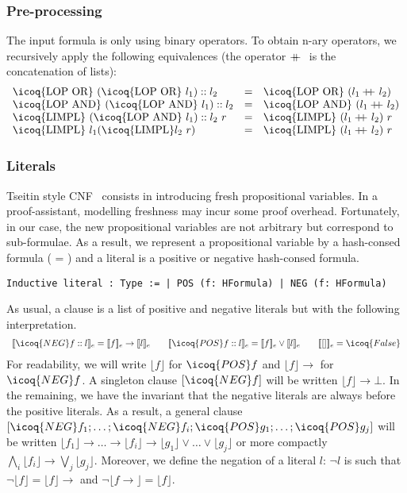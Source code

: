 \documentclass[utf8,a4paper,UKenglish,cleveref, autoref, thm-restate]{lipics-v2021}
\newcommand{\mcoq}[1]{\mbox{\icoq{#1}}}
\newcommand\doubleplus{+\kern-1.3ex+\kern0.8ex}
\begin{document}
\subsubsection{Pre-processing}
The input formula is only using binary operators.  To obtain n-ary
operators, we recursively apply the following equivalences (the
operator $\doubleplus$ is the concatenation of lists):
\[
  \begin{array}{lcl}
    \mcoq{LOP OR}\ (\mcoq{LOP OR}\ l_1):: l_2 &=& \mcoq{LOP OR}\ (l_1 \doubleplus l_2)\\
    \mcoq{LOP AND}\ (\mcoq{LOP AND}\ l_1):: l_2 &=& \mcoq{LOP AND}\ (l_1 \doubleplus l_2)\\
    \mcoq{LIMPL}\ (\mcoq{LOP AND}\ l_1):: l_2\  r  &=& \mcoq{LIMPL}\ (l_1 \doubleplus l_2)\ r\\
    \mcoq{LIMPL}\ l_1 (\mcoq{LIMPL} l_2\ r)  &=& \mcoq{LIMPL}\ (l_1 \doubleplus l_2)\ r\\
  \end{array}
\]

\subsubsection{Literals}
Tseitin style CNF~\cite{Tseitin1983} consists in introducing fresh
propositional variables.  In a proof-assistant, modelling freshness
may incur some proof overhead. Fortunately, in our case, the new
propositional variables are not arbitrary but correspond to
sub-formulae. As a result, we represent a propositional variable by a
hash-consed formula ( = ) and a
literal is a positive or negative hash-consed formula.
\begin{verbatim}
Inductive literal : Type := | POS (f: HFormula) | NEG (f: HFormula)
\end{verbatim}
\newcommand\Lit[1]{\lfloor #1 \rfloor }
As usual, a clause is a list of positive and negative literals but with the following interpretation.
\[
  \begin{array}{lcl}
    \llbracket \icoq{NEG} f :: l \rrbracket_e =  \llbracket f \rrbracket_e \rightarrow \llbracket l \rrbracket_e \quad\quad
    \llbracket \icoq{POS} f :: l \rrbracket_e  =  \llbracket f \rrbracket_e \lor \llbracket l \rrbracket_e \qquad
    \llbracket [] \rrbracket_e =  \icoq{False} 
  \end{array}
\]
For readability, we will write $\Lit{f}$ for $\icoq{POS} f$ and
$\Lit{f} \to$ for $\icoq{NEG} f$. A singleton clause $[\icoq{NEG} f]$
will be written $\Lit{f} \to \bot$.  In the remaining, we have the
invariant that the negative literals are always before the positive
literals.  As a result, a general clause
$[\icoq{NEG} f_1 ; \dots; \icoq{NEG} f_i; \icoq{POS}
g_1;\dots;\icoq{POS} g_j ]$ will be written
$\Lit{f_1} \to \dots \to \Lit{f_i} \to \Lit{g_1} \lor \dots \lor
\Lit{g_j}$ or more compactly
$\bigwedge_i \Lit{f_i} \to \bigvee_j \Lit{g_j}$.  Moreover, we define
the negation of a literal $l$: $\neg l$ is such that
$\neg \Lit{f} = \Lit{f} \to$ and $\neg {\Lit{f \to}} = \Lit{f}$.
\end{document}
